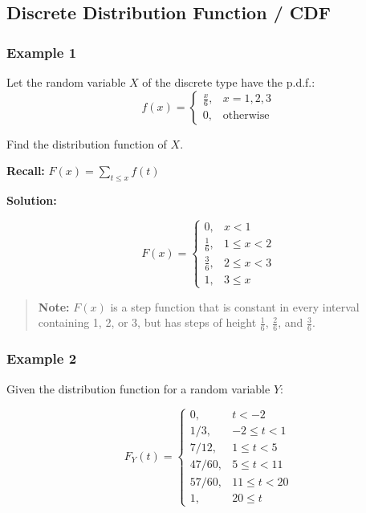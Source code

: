 \documentclass[
]{article}
\begin{document}
\subsection{Discrete Distribution Function /
CDF}\label{discrete-distribution-function-cdf}

\subsubsection{Example 1}\label{example-1-1}

Let the random variable \(X\) of the discrete type have the p.d.f.:
\[f(x) = \begin{cases} \frac{x}{6}, & x = 1, 2, 3 \\ 0, & \text{otherwise} \end{cases}\]

Find the distribution function of \(X\).

\textbf{Recall:} \(F(x) = \displaystyle\sum_{t \leq x} f(t)\)

\textbf{Solution:}

\[F(x) = \begin{cases} 0, & x < 1 \\ \frac{1}{6}, & 1 \leq x < 2 \\ \frac{3}{6}, & 2 \leq x < 3 \\ 1, & 3 \leq x \end{cases}\]

\begin{quote}
\textbf{Note:} \(F(x)\) is a step function that is constant in every
interval containing 1, 2, or 3, but has steps of height \(\frac{1}{6}\),
\(\frac{2}{6}\), and \(\frac{3}{6}\).
\end{quote}

\subsubsection{Example 2}\label{example-2-1}

Given the distribution function for a random variable \(Y\):

\[F_Y(t) = \begin{cases} 0, & t < -2 \\ 1/3, & -2 \leq t < 1 \\ 7/12, & 1 \leq t < 5 \\ 47/60, & 5 \leq t < 11 \\ 57/60, & 11 \leq t < 20 \\ 1, & 20 \leq t \end{cases}\]
\end{document}
